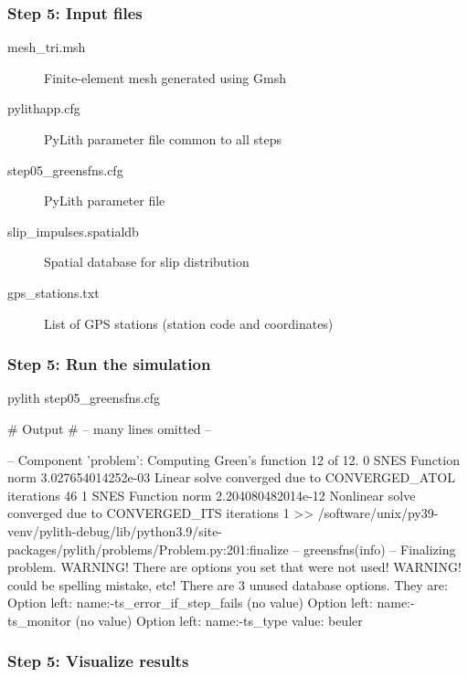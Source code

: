 \documentclass[aspectratio=169]{beamer}
\begin{document}
\begin{frame}
  \frametitle{Step 5: Input files}
  \summary{}

  \begin{description}
  \item[mesh\_tri.msh] Finite-element mesh generated using Gmsh
  \item[pylithapp.cfg] PyLith parameter file common to all steps
  \item[step05\_greensfns.cfg] PyLith parameter file
  \item[slip\_impulses.spatialdb] Spatial database for slip distribution
  \item[gps\_stations.txt] List of GPS stations (station code and coordinates)
  \end{description}
    
\end{frame}


\begin{frame}[fragile]
  \frametitle{Step 5: Run the simulation}
  \summary{}

\begin{bashcode}
pylith step05_greensfns.cfg

# Output
# -- many lines omitted --

 -- Component 'problem': Computing Green's function 12 of 12.
  0 SNES Function norm 3.027654014252e-03
  Linear solve converged due to CONVERGED_ATOL iterations 46
  1 SNES Function norm 2.204080482014e-12
Nonlinear solve converged due to CONVERGED_ITS iterations 1
 >> /software/unix/py39-venv/pylith-debug/lib/python3.9/site-packages/pylith/problems/Problem.py:201:finalize
 -- greensfns(info)
 -- Finalizing problem.
WARNING! There are options you set that were not used!
WARNING! could be spelling mistake, etc!
There are 3 unused database options. They are:
Option left: name:-ts_error_if_step_fails (no value)
Option left: name:-ts_monitor (no value)
Option left: name:-ts_type value: beuler
\end{bashcode}
  
\end{frame}


\begin{frame}
  \frametitle{Step 5: Visualize results}

    
\end{frame}
\end{document}
